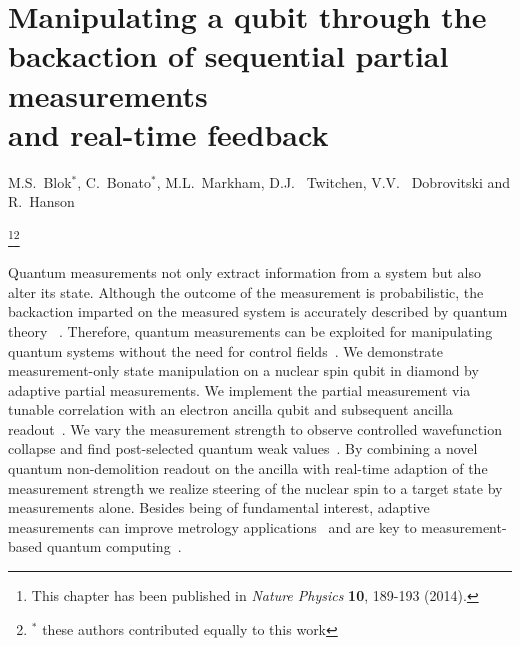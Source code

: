 \graphicspath{{./ch_adptv_msmnt_cntrl/figures/}}


\chapter{Manipulating a qubit through the backaction of sequential partial measurements \\ and real-time feedback }
\label{ch:AMC}

\begin{center} 
    \vspace{-1cm} {M.S.~Blok$^*$, C.~Bonato$^*$, M.L.~Markham, D.J. ~Twitchen, V.V. ~Dobrovitski and R.~Hanson} 
\end{center}


{\renewcommand{\thefootnote}{}\footnote{This chapter has been published in
    {\em Nature Physics} \textbf{10}, 189-193 (2014).}\footnote{$^*$ these authors contributed equally to this work}}


\vspace{-0.5cm} 
Quantum measurements not only extract information from a system but also alter its state. Although the outcome of the measurement is probabilistic, the backaction imparted on the measured system is accurately described by quantum theory ~\cite{Guerlin_Nature_2007,Hatridge_Science_2013,Murch_Nature_2013}. Therefore, quantum measurements can be exploited for manipulating quantum systems without the need for control fields~\cite{Ashhab_PhysRevA_2010,Wiseman_NatureNV_2011}. We demonstrate measurement-only state manipulation on a nuclear spin qubit in diamond by adaptive partial measurements. We implement the partial measurement via tunable correlation with an electron ancilla qubit and subsequent ancilla readout~\cite{Brun_PhysRevA_2008,Groen_PRL_2013}. We vary the measurement strength to observe controlled wavefunction collapse and find post-selected quantum weak values~\cite{Brun_PhysRevA_2008,Groen_PRL_2013,Aharonov_PRL_1988,Pryde_PRL_2005,Dressel_ArXiv_2013}. By combining a novel quantum non-demolition readout on the ancilla with real-time adaption of the measurement strength we realize steering of the nuclear spin to a target state by measurements alone. Besides being of fundamental interest, adaptive measurements can improve metrology applications~\cite{Cappellaro_PhysRevA_2012,Higgins_Nature_2007} and are key to measurement-based quantum computing~\cite{Raussendorf_PRL_2001,Prevedel_Nature_2007}.


\clearpage

